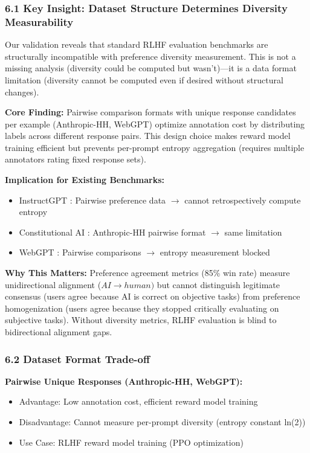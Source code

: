 
\subsubsection{6.1 Key Insight: Dataset Structure Determines Diversity Measurability}

Our validation reveals that standard RLHF evaluation benchmarks are structurally incompatible with preference diversity measurement. This is not a missing analysis (diversity could be computed but wasn't)---it is a data format limitation (diversity cannot be computed even if desired without structural changes).

\textbf{Core Finding:} Pairwise comparison formats with unique response candidates per example (Anthropic-HH, WebGPT) optimize annotation cost by distributing labels across different response pairs. This design choice makes reward model training efficient but prevents per-prompt entropy aggregation (requires multiple annotators rating fixed response sets).

\textbf{Implication for Existing Benchmarks:}
\begin{itemize}
\item InstructGPT \citep{ouyang2022instructgpt}: Pairwise preference data $\rightarrow$ cannot retrospectively compute entropy
\item Constitutional AI \citep{bai2022constitutional}: Anthropic-HH pairwise format $\rightarrow$ same limitation
\item WebGPT \citep{nakano2021webgpt}: Pairwise comparisons $\rightarrow$ entropy measurement blocked
\end{itemize}

\textbf{Why This Matters:} Preference agreement metrics (85\% win rate) measure unidirectional alignment ($AI\rightarrow human)$ but cannot distinguish legitimate consensus (users agree because AI is correct on objective tasks) from preference homogenization (users agree because they stopped critically evaluating on subjective tasks). Without diversity metrics, RLHF evaluation is blind to bidirectional alignment gaps.

\subsubsection{6.2 Dataset Format Trade-off}

\textbf{Pairwise Unique Responses (Anthropic-HH, WebGPT):}
\begin{itemize}
\item Advantage: Low annotation cost, efficient reward model training
\item Disadvantage: Cannot measure per-prompt diversity (entropy constant ln(2))
\item Use Case: RLHF reward model training (PPO optimization)
\end{itemize}

